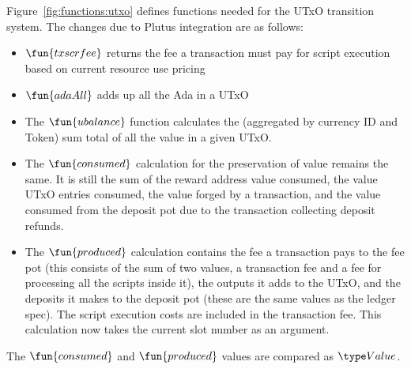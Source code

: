 Figure~\ref{fig:functions:utxo} defines functions needed for the UTxO transition system.
The changes due to Plutus integration are as follows:

\begin{itemize}
  \item $\fun{txscrfee}$ returns the fee a transaction must pay for script
  execution based on current resource use pricing

  \item $\fun{adaAll}$ adds up all the Ada in a UTxO

  \item
    The $\fun{ubalance}$ function calculates the (aggregated by currency ID and
    Token) sum total of all the value in a given UTxO.

  \item The $\fun{consumed}$ calculation for the preservation of value remains the
  same. It is still the sum of the reward address value consumed, the value
   UTxO entries consumed, the value forged by a transaction,
   and the value consumed from the deposit pot due
   to the transaction collecting deposit refunds.

  \item The $\fun{produced}$ calculation contains the fee a transaction pays
  to the fee pot (this consists of the sum of two values, a transaction fee and a
  fee for processing all the scripts inside it), the outputs it adds to the UTxO,
  and the deposits it makes
  to the deposit pot (these are the same values as the ledger spec).
  The script execution costs are included in the transaction fee.
  This calculation now takes the current slot number as an argument.
\end{itemize}

The $\fun{consumed}$ and $\fun{produced}$ values are compared as $\Value$.

